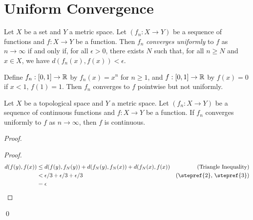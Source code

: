 \section{Uniform Convergence}

\begin{definition}
    Let $X$ be a set and $Y$ a metric space. Let $(f_n : X \rightarrow Y)$ be a sequence of functions and $f : X \rightarrow Y$ be a function.
    Then $f_n$ \emph{converges uniformly} to $f$ as $n \rightarrow \infty$ if and only if, for all $\epsilon > 0$, there exists $N$ such that, for all $n \geq N$ and $x \in X$,
    we have $d(f_n(x),f(x)) < \epsilon$.
\end{definition}

\begin{example}
    Define $f_n : [0,1] \rightarrow \mathbb{R}$ by $f_n(x) = x^n$ for $n \geq 1$, and $f : [0,1] \rightarrow \mathbb{R}$ by $f(x) = 0$ if $x < 1$, $f(1) = 1$.  Then $f_n$ converges to $f$
    pointwise but not uniformly.
\end{example}

\begin{theorem}
    Let $X$ be a topological space and $Y$ a metric space.  Let $(f_n : X \rightarrow Y)$ be a sequence of continuous functions and $f : X \rightarrow Y$ be a function.
    If $f_n$ converges uniformly to $f$ as $n \rightarrow \infty$, then $f$ is continuous.
\end{theorem}

\begin{proof}
    \pf
    \begin{proof}
        \pf
        \begin{align*}
            d(f(y),f(x)) & \leq d(f(y),f_N(y)) + d(f_N(y),f_N(x)) + d(f_N(x),f(x)) & (\text{Triangle Inequality}) \\
            & < \epsilon / 3 + \epsilon / 3 + \epsilon / 3 & (\text{\stepref{2}, \stepref{3}})\\
            & = \epsilon
        \end{align*}
    \end{proof}
    \qed
\end{proof}

